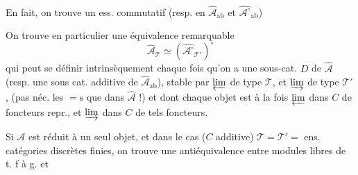 En fait, on trouve un 
ess. commutatif
(resp. en $\widehat{\mathcal A}_{\mathrm{ab}}$ et $\widehat{\mathcal A^\circ}_{\mathrm{ab}}$)

On trouve en particulier une
équivalence remarquable
\[
 \widehat{\mathcal A}_{\mathcal T}\simeq
 (\widehat{\mathcal A^\circ}_{\mathcal T'})^\circ
\]
qui peut se définir intrinsèquement  chaque fois qu'on a une
sous-cat. $D$ de $\widehat{\mathcal A}$ (resp. une sous cat.
additive de $\widehat{\mathcal A}_{\mathrm{ab}}$), stable  par
$\varprojlim$ de type $\mathcal T$, et  $\varinjlim$ de type $\mathcal T'$,
(pas néc. les $=\mathrm{s}$ que dans $\widehat{\mathcal A}$ !)
et dont chaque objet est à la fois
$\varprojlim$  dans $C$ de foncteurs repr.,
et $\varinjlim$  dans $C$ de tels foncteurs.

Si $\mathcal A$ est réduit à un seul objet,  et
dans le cas  ($C$ additive)
$\mathcal T=\mathcal T'=$ ens. catégories discrètes finies,
on trouve une antiéquivalence
entre modules libres de t. f à g. et
